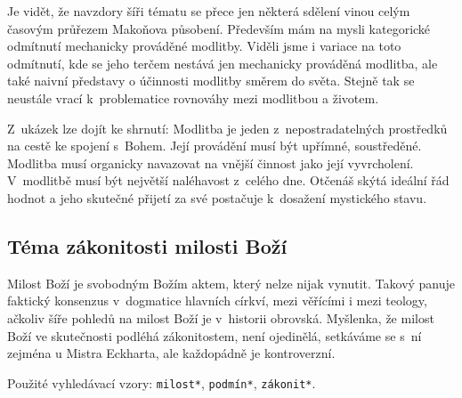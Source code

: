Je vidět, že navzdory šíři tématu se přece jen některá sdělení vinou celým
časovým průřezem Makoňova působení. Především mám na mysli kategorické odmítnutí
mechanicky prováděné modlitby. Viděli jsme i variace na toto odmítnutí, kde se
jeho terčem nestává jen mechanicky prováděná modlitba, ale také naivní představy
o účinnosti modlitby směrem do světa. Stejně tak se neustále vrací k~problematice
rovnováhy mezi modlitbou a životem.

Z~ukázek lze dojít ke shrnutí: Modlitba je jeden z~nepostradatelných prostředků
na cestě ke spojení s~Bohem. Její provádění musí být upřímné, soustředěné.
Modlitba musí organicky navazovat na vnější činnost jako její vyvrcholení.
V~modlitbě musí být největší naléhavost z~celého dne. Otčenáš skýtá ideální řád
hodnot a jeho skutečné přijetí za své postačuje k~dosažení mystického stavu.

\subsection{Téma zákonitosti milosti Boží}

Milost Boží je svobodným Božím aktem, který nelze nijak vynutit. Takový panuje
faktický konsenzus v~dogmatice hlavních církví, mezi věřícími i mezi teology,
ačkoliv šíře pohledů na milost Boží je v~historii
obrovská\cite{pinnock1989grace}\cite{studer1997grace}\cite{grace1965luther}.
Myšlenka, že milost Boží ve skutečnosti podléhá zákonitostem, není ojedinělá,
setkáváme se s~ní zejména u Mistra Eckharta\cite{landauer1978eckhart}, ale každopádně je kontroverzní.

Použité vyhledávací vzory:
\texttt{milost*},
\texttt{podmín*},
\texttt{zákonit*}.

